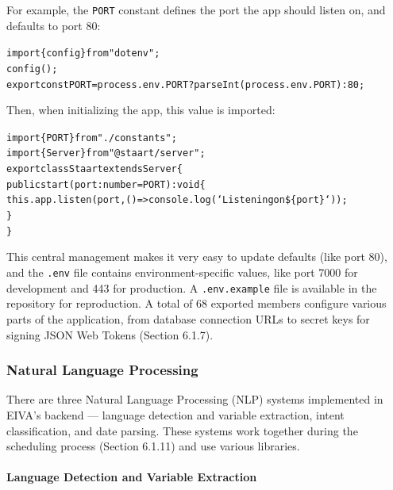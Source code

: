 \documentclass{article}
\begin{document}
For example, the \texttt{PORT} constant defines the port the app should listen on, and defaults to port 80:

\begin{alltt}
\textcolor{keyword}{import} \{ config \} \textcolor{keyword}{from} \textcolor{string}{"dotenv"};
\textcolor{variable}{config}();
\textcolor{keyword}{export const} \textcolor{symbol}{PORT} = process.\textcolor{variable}{env}.\textcolor{symbol}{PORT} ? parseInt(process.\textcolor{variable}{env}.\textcolor{symbol}{PORT}) : \textcolor{literal}{80};
\end{alltt}

Then, when initializing the app, this value is imported:

\begin{alltt}
\textcolor{keyword}{import} \{ PORT \} \textcolor{keyword}{from} \textcolor{string}{"./constants"};
\textcolor{keyword}{import} \{ Server \} \textcolor{keyword}{from} \textcolor{string}{"@staart/server"};
\textcolor{keyword}{export class} Staart \textcolor{keyword}{extends} Server \{
  \textcolor{keyword}{public} start(port: number = \textcolor{symbol}{PORT}): \textcolor{keyword}{void} \{
    this.\textcolor{variable}{app}.\textcolor{variable}{listen}(port, () => console.\textcolor{variable}{log}(\textcolor{string}{`Listening on} \$\{port\}\textcolor{string}{`}));
  \}
\}
\end{alltt}

This central management makes it very easy to update defaults (like port 80), and the \texttt{.env} file contains environment-specific values, like port 7000 for development and 443 for production. A \texttt{.env.example} file is available in the repository for reproduction. A total of 68 exported members configure various parts of the application, from database connection URLs to secret keys for signing JSON Web Tokens (Section 6.1.7).

\subsubsection{Natural Language Processing}

There are three Natural Language Processing (NLP) systems implemented in EIVA's backend --- language detection and variable extraction, intent classification, and date parsing. These systems work together during the scheduling process (Section 6.1.11) and use various libraries.

\paragraph{Language Detection and Variable Extraction}
\end{document}
